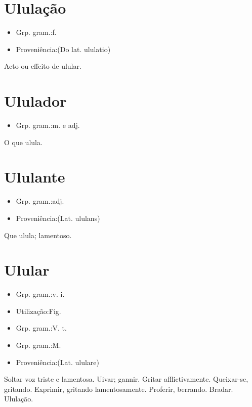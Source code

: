 \documentclass{article}
\begin{document}
\section{Ululação}
\begin{itemize}
\item {Grp. gram.:f.}
\end{itemize}
\begin{itemize}
\item {Proveniência:(Do lat. \textunderscore ululatio\textunderscore )}
\end{itemize}
Acto ou effeito de ulular.
\section{Ululador}
\begin{itemize}
\item {Grp. gram.:m.  e  adj.}
\end{itemize}
O que ulula.
\section{Ululante}
\begin{itemize}
\item {Grp. gram.:adj.}
\end{itemize}
\begin{itemize}
\item {Proveniência:(Lat. \textunderscore ululans\textunderscore )}
\end{itemize}
Que ulula; lamentoso.
\section{Ulular}
\begin{itemize}
\item {Grp. gram.:v. i.}
\end{itemize}
\begin{itemize}
\item {Utilização:Fig.}
\end{itemize}
\begin{itemize}
\item {Grp. gram.:V. t.}
\end{itemize}
\begin{itemize}
\item {Grp. gram.:M.}
\end{itemize}
\begin{itemize}
\item {Proveniência:(Lat. \textunderscore ululare\textunderscore )}
\end{itemize}
Soltar voz triste e lamentosa.
Uivar; gannir.
Gritar afflictivamente.
Queixar-se, gritando.
Exprimir, gritando lamentosamente.
Proferir, berrando.
Bradar.
Ululação.
\end{document}
